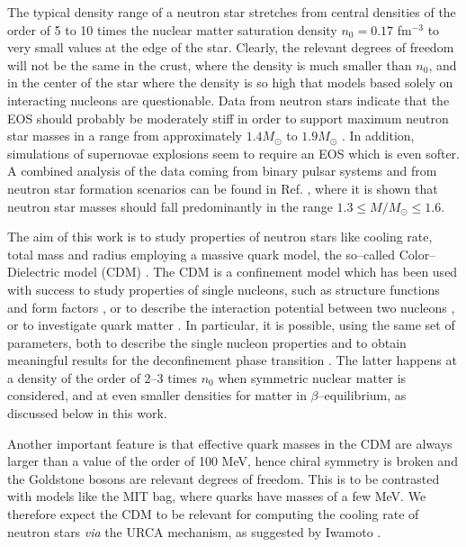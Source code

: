 The typical density range of a neutron star
stretches from central densities of the order of 5 to 10
times the nuclear matter saturation density $n_0=0.17$
fm$^{-3}$ to very small values
at the edge of the star. Clearly,
the relevant degrees of freedom will not be the same in the crust,
where the density is much smaller than $n_0$, and in the center
of the star where the density is so high that models based
solely on interacting
nucleons are questionable.
Data from
neutron stars indicate that the EOS  
should probably be moderately stiff in order to
support maximum neutron star masses in a range
from approximately 
$1.4 M_{\odot}$ to $1.9 M_{\odot}$ \cite{thorsett93}. In addition,
simulations of supernovae explosions seem to require an EOS which is 
even softer. A combined analysis of the data coming from binary pulsar
systems and from neutron star formation scenarios can be found
in Ref. \cite{finn}, where it is shown that neutron star masses should fall
predominantly in the range $1.3\le M/M_{\odot}\le 1.6 $.

The aim of this work is to 
study properties of neutron stars like cooling rate,
total mass and radius employing a massive quark model, the
so--called Color--Dielectric model (CDM) \cite{pirner92,birse90,dfb95}.
The CDM is a confinement model which has been used with success 
to study 
properties of 
single nucleons, such as structure functions \cite{barone}
and form factors \cite{ff}, or to describe the
interaction potential between two nucleons \cite{kurt}, or to investigate
quark matter \cite{dfb95,mitja}.
In particular,
it is possible, using the same set of parameters,
both to describe the single nucleon properties 
and to obtain meaningful results
for the deconfinement phase transition \cite{dfb95}.
The latter happens at a density of the order
of 2--3 times $n_0$ when symmetric nuclear matter is considered, 
and at even smaller densities for matter in $\beta$--equilibrium,
as discussed below in this work.

Another important feature is 
that  effective quark masses in the CDM are always larger than
a value of the order of 100 MeV, hence chiral symmetry is broken and
the Goldstone bosons are relevant degrees of freedom. This is to be
contrasted with models like the MIT bag, 
where quarks have masses of a few MeV.
We therefore expect the CDM to be relevant 
for computing the cooling rate of neutron stars {\it via} 
the URCA
mechanism, as suggested by Iwamoto \cite{iwa}.



